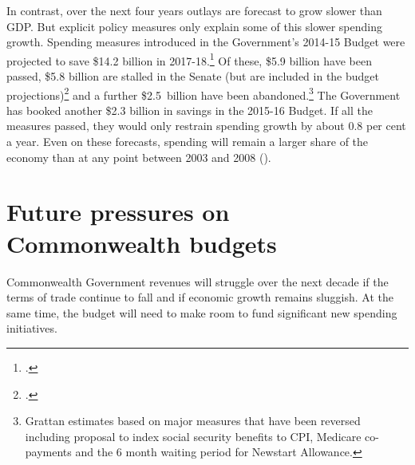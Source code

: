 \documentclass[twoside,english]{grattanBudgetRepairb5portrait}
\begin{document}
In contrast, over the next four years outlays are forecast to grow slower than GDP\@. But explicit policy measures only explain some of this slower spending growth. Spending measures introduced in the Government’s 2014-15 Budget were projected to save \$14.2 billion in 2017-18.\footcite[][BP~No.~2, p~47]{Treasury2015BudgetPapers201516}  Of these, \$5.9 billion have been passed, \$5.8 billion are stalled in the Senate (but are included in the budget projections)\footcite{PBO2015f}  and a further \$2.5~billion have been abandoned.\footnote{Grattan estimates based on major measures that have been reversed including proposal to index social security benefits to CPI, Medicare co-payments and the 6 month waiting period for Newstart Allowance.}  The Government has booked another \$2.3 billion in savings in the 2015-16 Budget. If all the measures passed, they would only restrain spending growth by about 0.8 per cent a year.  Even on these forecasts, spending will remain a larger share of the economy than at any point between 2003 and 2008 ().

\cleardoubleevenstandardpage
{}
\FloatBarrier
\afterpage{\cleardoublepage}


\chapter{Future pressures on Commonwealth budgets}\label{chapter:FISCAL-3}
Commonwealth Government revenues will struggle over the next decade if the terms of trade continue to fall and if economic growth remains sluggish. At the same time, the budget will need to make room to fund significant new spending initiatives. 
\end{document}
